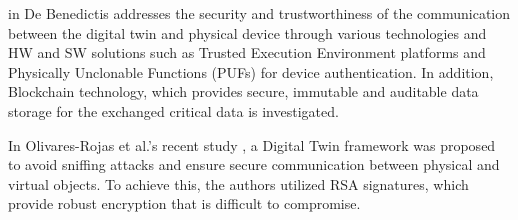 in\cite{debenedictisAdoptionSecureCyber2022} De Benedictis addresses the security and trustworthiness of the communication between the digital twin and physical device through various technologies and HW and SW solutions such as Trusted Execution Environment platforms and Physically Unclonable Functions (PUFs) for device authentication. In addition,  Blockchain technology, which provides secure, immutable and auditable data storage for the exchanged critical data is investigated. 

In Olivares-Rojas et al.'s recent study \cite{olivares-rojasCybersecuritySmartGrid2022}, a Digital Twin framework was proposed to avoid sniffing attacks and ensure secure communication between physical and virtual objects. To achieve this, the authors utilized RSA signatures, which provide robust encryption that is difficult to compromise.
